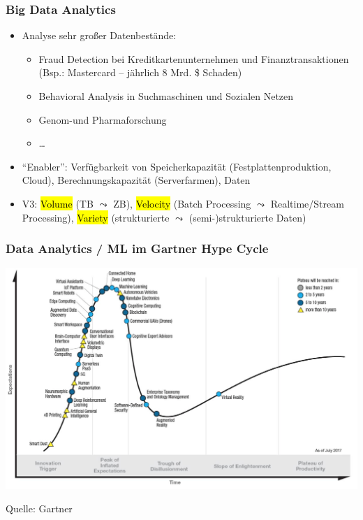 \begin{frame}
\frametitle{Big Data Analytics}

\begin{itemize}
\item Analyse sehr großer Datenbestände:
\begin{itemize}
\item Fraud Detection bei Kreditkartenunternehmen und
  Finanztransaktionen (Bsp.: Mastercard -- jährlich 8 Mrd. \$ Schaden)
\item  Behavioral Analysis in Suchmaschinen und Sozialen Netzen
\item Genom-und Pharmaforschung
\item \dots
\end{itemize}
\item "`Enabler"': Verfügbarkeit von Speicherkapazität
  (Festplattenproduktion, Cloud), Berechnungskapazität (Serverfarmen), Daten
\item V3: \hl{Volume} (TB $\leadsto$ ZB), \hl{Velocity} (Batch Processing
  $\leadsto$ Realtime/Stream Processing), \hl{Variety} (strukturierte
  $\leadsto$ (semi-)strukturierte Daten)
\end{itemize}

\end{frame}


\begin{frame}
\frametitle{Data Analytics / ML im Gartner Hype Cycle}

\begin{center}
\includegraphics[scale=.45]{fig1/gartner_hype_cycle_2017.png}
\end{center}

\footnotesize{Quelle: Gartner}
\end{frame}

